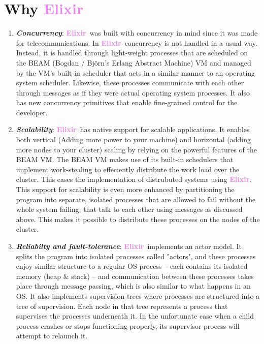 \documentclass[12pt]{article}
\newcommand{\bb}[1]{\textbf{\textit{#1}}}
\newcommand{\vio}[1]{\textbf{\textcolor{violet}{#1}}}
\newcommand{\elix}{\vio{Elixir}}
\begin{document}
\newpage
{}
\pagestyle{fancy}
\section{Why \elix\ }
\begin{enumerate}[label= \roman*.]
    \item \bb{Concurrency}: \elix\ was built with concurrency in mind since it was made for telecommunications. In \elix\, concurrency is not handled in a usual way. Instead, it is handled through light-weight processes that are scheduled on the BEAM (Bogdan / Björn's Erlang Abstract Machine) \@ VM and managed by the \@ VM's built-in scheduler that acts in a similar manner to an operating system scheduler. Likewise, these processes communicate with each other through messages as if they were actual operating system processes. It also has new concurrency primitives that enable fine-grained control for the developer.

    \item \bb{Scalability}: \elix\ has native support for scalable applications. It enables both vertical (Adding more power to your machine) and horizontal (adding more nodes to your cluster) scaling by relying on the powerful features of the BEAM \@ VM. The BEAM \@ VM makes use of its built-in schedulers that implement work-stealing to effeciently distribute the work load over the cluster. This eases the implementation of distrubuted systems using \elix. This support for scalability is even more enhanced by partitioning the program into separate, isolated processes that are allowed to fail without the whole system failing, that talk to each other using messages as discussed above. This makes it possible to distribute these processes on the nodes of the cluster.

    \item \bb{Reliabilty and fault-tolerance}: \elix\ implements an actor model. It splits the program into isolated processes called "actors", and these processes enjoy similar structure to a regular OS process -- each contains its isolated memory (heap \& stack) -- and communication between these processes takes place through message passing, which is also similar to what happens in an \@ OS. It also implements supervision trees where processes are structured into a tree of supervision. Each node in that tree represents a process that supervises the processes underneath it. In the unfortunate case when a child process crashes or stops functioning properly, its supervisor process will attempt to relaunch it.


\end{enumerate}
\end{document}
